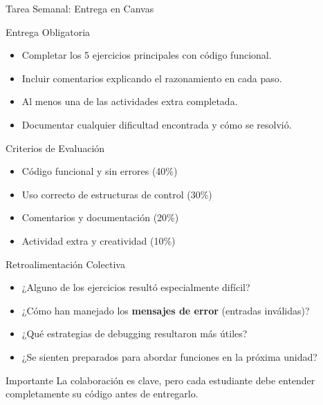 \documentclass[10pt]{beamer}
\begin{document}
\begin{frame}{Tarea Semanal: Entrega en Canvas}
  \begin{block}{Entrega Obligatoria}
    \begin{itemize}
      \item Completar los 5 ejercicios principales con código funcional.
      \item Incluir comentarios explicando el razonamiento en cada paso.
      \item Al menos una de las actividades extra completada.
      \item Documentar cualquier dificultad encontrada y cómo se resolvió.
    \end{itemize}
  \end{block}
  
  \begin{block}{Criterios de Evaluación}
    \begin{itemize}
      \item Código funcional y sin errores (40\%)
      \item Uso correcto de estructuras de control (30\%)
      \item Comentarios y documentación (20\%)
      \item Actividad extra y creatividad (10\%)
    \end{itemize}
  \end{block}
\end{frame}

\begin{frame}{Retroalimentación Colectiva}
  \begin{itemize}
    \item ¿Alguno de los ejercicios resultó especialmente difícil?
    \item ¿Cómo han manejado los \textbf{mensajes de error} (entradas inválidas)?
    \item ¿Qué estrategias de debugging resultaron más útiles?
    \item ¿Se sienten preparados para abordar funciones en la próxima unidad?
  \end{itemize}
  
  \begin{alertblock}{Importante}
    La colaboración es clave, pero cada estudiante debe entender completamente su código antes de entregarlo.
  \end{alertblock}
\end{frame}
\end{document}
